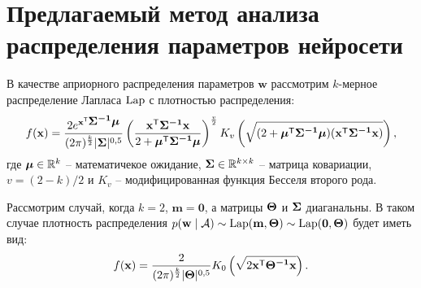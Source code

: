 \newpage

\section{Предлагаемый метод анализа распределения параметров нейросети}
В качестве априорного распределения параметров $\mathbf{w}$ рассмотрим $k$-мерное распределение Лапласа $\operatorname{Lap}$ с плотностью распределения:
\begin{equation} \label{methods.1}
f(\mathbf{x}) = \frac{2e^{\mathbf{x}^{\mathsf{T}}\mbox{\boldmath$\Sigma^{-1}$}\mbox{\boldmath$\mu$}}}{(2\pi)^{\frac{k}{2}}|\mbox{\boldmath$\Sigma$}|^{0,5}} \left( \frac{\mathbf{x}^{\mathsf{T}}\mbox{\boldmath$\Sigma^{-1}$}\mathbf{x}}{2 + \mbox{\boldmath$\mu$}^{\mathsf{T}}\mbox{\boldmath$\Sigma^{-1}$}\mbox{\boldmath$\mu$}} \right)^{\frac{v}{2}} K_v \left( \sqrt{(2 + \mbox{\boldmath$\mu$}^{\mathsf{T}}\mbox{\boldmath$\Sigma^{-1}$}\mbox{\boldmath$\mu$})(\mathbf{x}^{\mathsf{T}}\mbox{\boldmath$\Sigma^{-1}$}\mathbf{x})} \right),
\end{equation}
где $\mbox{\boldmath$\mu$} \in \mathbb{R}^k$ -- математичекое ожидание, $\mbox{\boldmath$\Sigma$} \in \mathbb{R}^{k \times k}$ -- матрица ковариации, $v = (2-k)/2$ и $K_v$ -- модифицированная функция Бесселя второго рода.

Рассмотрим случай, когда $k = 2$, $\mathbf{m} = \mathbf{0}$, а матрицы $\mbox{\boldmath$\Theta$}$ и $\mbox{\boldmath$\Sigma$}$ диаганальны. В таком случае плотность распределения $p(\mathbf{w} \mid \mathcal{A}) \sim \operatorname{Lap}(\mathbf{m}, \mbox{\boldmath$\Theta$}) \sim \operatorname{Lap}(\mathbf{0}, \mbox{\boldmath$\Theta$})$ будет иметь вид:
\begin{equation} \label{methods.2}
f(\mathbf{x}) = \frac{2}{(2\pi)^{\frac{k}{2}}|\mbox{\boldmath$\Theta$}|^{0,5}} K_0 \left( \sqrt{2 \mathbf{x}^{\mathsf{T}}\mbox{\boldmath$\Theta^{-1}$}\mathbf{x}} \right).
\end{equation}

